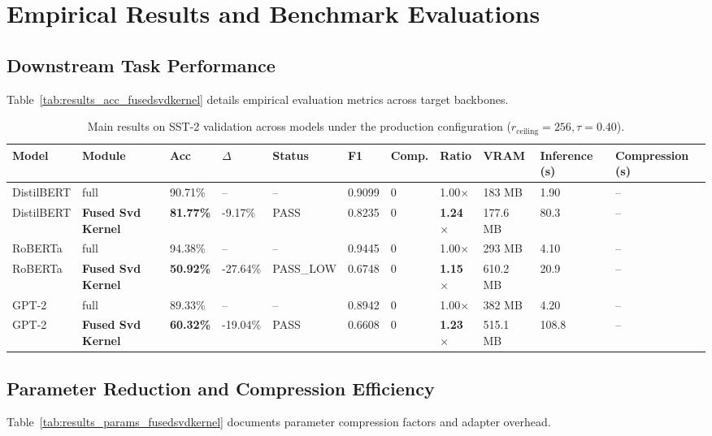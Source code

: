 \section{Empirical Results and Benchmark Evaluations}

\subsection{Downstream Task Performance}
Table~\ref{tab:results_acc_fusedsvdkernel} details empirical evaluation metrics across target backbones.

\begin{table}[t]
\centering
\small
\begin{tabular}{lllllllllll}
\toprule
\textbf{Model} & \textbf{Module} & \textbf{Acc} & \textbf{$\Delta$} & \textbf{Status} & \textbf{F1} & \textbf{Comp.} & \textbf{Ratio} & \textbf{VRAM} & \textbf{Inference (s)} & \textbf{Compression (s)} \\
\midrule
DistilBERT & full & 90.71\% & -- & -- & 0.9099 & 0 & 1.00$\times$ & 183 MB & 1.90 & -- \\
DistilBERT & \textbf{Fused Svd Kernel} & \textbf{81.77\%} & -9.17\% & PASS & 0.8235 & 0 & \textbf{1.24$\times$} & 177.6 MB & 80.3 & -- \\
RoBERTa & full & 94.38\% & -- & -- & 0.9445 & 0 & 1.00$\times$ & 293 MB & 4.10 & -- \\
RoBERTa & \textbf{Fused Svd Kernel} & \textbf{50.92\%} & -27.64\% & PASS_LOW & 0.6748 & 0 & \textbf{1.15$\times$} & 610.2 MB & 20.9 & -- \\
GPT-2 & full & 89.33\% & -- & -- & 0.8942 & 0 & 1.00$\times$ & 382 MB & 4.20 & -- \\
GPT-2 & \textbf{Fused Svd Kernel} & \textbf{60.32\%} & -19.04\% & PASS & 0.6608 & 0 & \textbf{1.23$\times$} & 515.1 MB & 108.8 & -- \\
\bottomrule
\end{tabular}
\caption{Main results on SST-2 validation across models under the production configuration ($r_{\mathrm{ceiling}}=256, \tau=0.40$).}
\label{tab:main_sst2}
\end{table}

\subsection{Parameter Reduction and Compression Efficiency}
Table~\ref{tab:results_params_fusedsvdkernel} documents parameter compression factors and adapter overhead.

